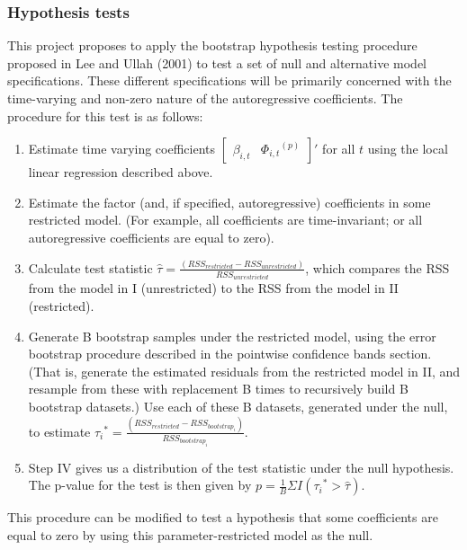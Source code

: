 \documentclass{article}
\begin{document}
\subsubsection{Hypothesis tests}
This project proposes to apply the bootstrap hypothesis testing procedure proposed in Lee and Ullah (2001) to test a set of null and alternative model specifications. These different specifications will be primarily concerned with the time-varying and non-zero nature of the autoregressive coefficients. The procedure for this test is as follows:
\renewcommand{\theenumi}{\Roman{enumi}}
\begin{enumerate}
	\item{Estimate time varying coefficients \({\begin{bmatrix}\beta_{i,t} &{\Phi_{i,t}}^{(p)}\end{bmatrix}}' \) for all \(t\) using the local linear regression described above.}
	\item{Estimate the factor (and, if specified, autoregressive) coefficients in some restricted model. (For example, all coefficients are time-invariant; or all autoregressive coefficients are equal to zero).}
	\item{Calculate test statistic \(\hat{\tau} = \frac{(RSS_{restricted} - RSS_{unrestricted})}{RSS_{unrestricted}}\), which compares the RSS from the model in I (unrestricted) to the RSS from the model in II (restricted).}
	\item{Generate B bootstrap samples under the restricted model, using the error bootstrap procedure described in the pointwise confidence bands section. (That is, generate the estimated residuals from the restricted model in II, and resample from these with replacement B times to recursively build B bootstrap datasets.) Use each of these B datasets, generated under the null, to estimate \({\tau_{i}}^{*} = \frac{(RSS_{restricted} - RSS_{bootstrap_{i}})}{RSS_{bootstrap_{i}}}\).}
	\item{Step IV gives us a distribution of the test statistic under the null hypothesis. The p-value for the test is then given by \( p = \frac{1}{B} \Sigma I({\tau_{i}}^{*} >  \hat{\tau}) \).}
\end{enumerate}
\noindent
This procedure can be modified to test a hypothesis that some coefficients are equal to zero by using this parameter-restricted model as the null.
\newline
\newline
\end{document}
